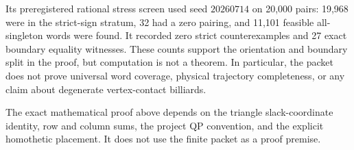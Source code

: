 Its preregistered rational stress screen used seed \(20260714\) on 20,000
pairs: 19,968 were in the strict-sign stratum, 32 had a zero pairing, and
11,101 feasible all-singleton words were found.  It recorded zero strict
counterexamples and 27 exact boundary equality witnesses.  These counts
support the orientation and boundary split in the proof, but computation is
not a theorem.  In particular, the packet does not prove universal word
coverage, physical trajectory completeness, or any claim about degenerate
vertex-contact billiards.

The exact mathematical proof above depends on the triangle slack-coordinate
identity, row and column sums, the project QP convention, and the explicit
homothetic placement.  It does not use the finite packet as a proof premise.
